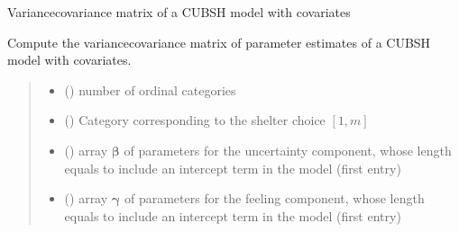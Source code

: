 \documentclass[letterpaper,10pt,english]{sphinxmanual}
\begin{document}
\begin{fulllineitems}
\label{\detokenize{cubmods:cubmods.cubsh_ywx.varcov}}
\pysigstartsignatures
{}
\pysigstopsignatures
\sphinxAtStartPar
Variance\sphinxhyphen{}covariance matrix of a CUBSH model with covariates

\sphinxAtStartPar
Compute the variance\sphinxhyphen{}covariance matrix of parameter estimates of a CUBSH model with covariates.
\begin{quote}\begin{description}
\begin{itemize}
\item {} 
\sphinxAtStartPar
{} () \textendash{} number of ordinal categories

\item {} 
\sphinxAtStartPar
{} () \textendash{} Category corresponding to the shelter choice \([1,m]\)

\item {} 
\sphinxAtStartPar
{} () \textendash{} array \(\pmb \beta\) of parameters for the uncertainty component, whose length equals 
 to include an intercept term in the model (first entry)

\item {} 
\sphinxAtStartPar
{} () \textendash{} array \(\pmb \gamma\) of parameters for the feeling component, whose length equals 
 to include an intercept term in the model (first entry)


\end{itemize}
\end{description}
\end{quote}
\end{fulllineitems}
\end{document}
